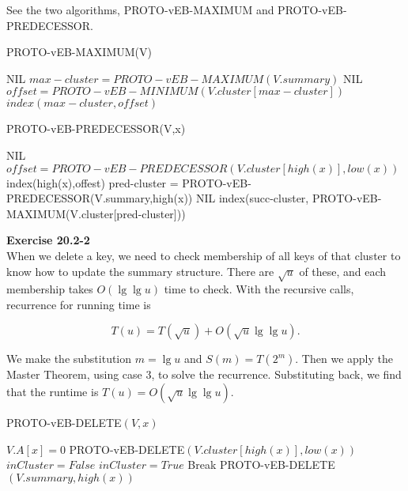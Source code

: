 \documentclass{article}
\begin{document}
See the two algorithms, PROTO-vEB-MAXIMUM and PROTO-vEB-PREDECESSOR.
\begin{algorithm}
\caption{PROTO-vEB-MAXIMUM(V)}
\begin{algorithmic}
\State {}
\State {}
\Else
\State \Return NIL
\EndIf
\Else
\State $max-cluster = PROTO-vEB-MAXIMUM(V.summary)$
\State \Return NIL
\Else
\State $offset =  PROTO-vEB-MINIMUM(V.cluster[max-cluster])$
\State \Return $index(max-cluster,offset)$
\EndIf
\EndIf
\end{algorithmic}
\end{algorithm}

\begin{algorithm}
\caption{PROTO-vEB-PREDECESSOR(V,x)}
\begin{algorithmic}
\State {}
\Else
\State \Return NIL
\EndIf
\Else
\State $offset = PROTO-vEB-PREDECESSOR(V.cluster[high(x)],low(x))$
\State \Return index(high(x),offest)
\Else
\State pred-cluster = PROTO-vEB-PREDECESSOR(V.summary,high(x))
\State \Return NIL
\Else
\State \Return index(succ-cluster, PROTO-vEB-MAXIMUM(V.cluster[pred-cluster]))
\EndIf
\EndIf
\EndIf
\end{algorithmic}
\end{algorithm}

\noindent\textbf{Exercise 20.2-2}\\

When we delete a key, we need to check membership of all keys of that cluster to know how to update the summary structure.  There are $\sqrt{u}$ of these, and each membership takes $O(\lg \lg u)$ time to check.  With the recursive calls, recurrence for running time is 

\[ T(u) = T(\sqrt{u}) + O(\sqrt{u}\lg \lg u).\]

We make the substitution $m = \lg u$ and $S(m) = T(2^m)$. Then we apply the Master Theorem, using case 3, to solve the recurrence.  Substituting back, we find that the runtime is $T(u) = O(\sqrt{u} \lg \lg u)$.\\

\begin{algorithm}
\caption{PROTO-vEB-DELETE$(V,x)$}
\begin{algorithmic}
	\State $V.A[x] = 0$
\Else
	\State PROTO-vEB-DELETE$(V.cluster[high(x)], low(x))$
	\State $inCluster = False$
			\State $inCluster = True$
			\State Break
		\EndIf
	\EndFor
		\State PROTO-vEB-DELETE$(V.summary, high(x))$
	\EndIf
\EndIf
\end{algorithmic}
\end{algorithm}
\end{document}
